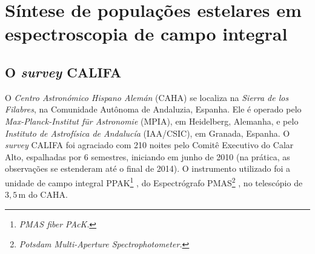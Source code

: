 


\chapter{Síntese de populações estelares em espectroscopia de campo integral}
\label{sec:ifs}


\section{O {\em survey} CALIFA}
\label{sec:ifs:califa}

O {\em Centro Astronómico Hispano Alemán} (CAHA) se localiza na {\em Sierra de
los Filabres}, na Comunidade Autônoma de Andaluzia, Espanha. Ele é operado pelo
{\em Max-Planck-Institut für Astronomie} (MPIA), em Heidelberg, Alemanha, e pelo
{\em Instituto de Astrofísica de Andalucía} (IAA/CSIC), em Granada, Espanha. O
{\em survey} CALIFA foi agraciado com 210 noites pelo Comitê Executivo do Calar
Alto, espalhadas por 6 semestres, iniciando em junho de 2010 (na prática, as
observações se estenderam até o final de 2014). O instrumento utilizado foi a
unidade de campo integral PPAK\footnote{{\em PMAS fiber PAcK}.}
\citep{Kelz2006}, do Espectrógrafo PMAS\footnote{{\em Potsdam Multi-Aperture
Spectrophotometer.}} \citep{Roth2005, Roth2010}, no telescópio de
$3,5\,\mathrm{m}$ do CAHA.

